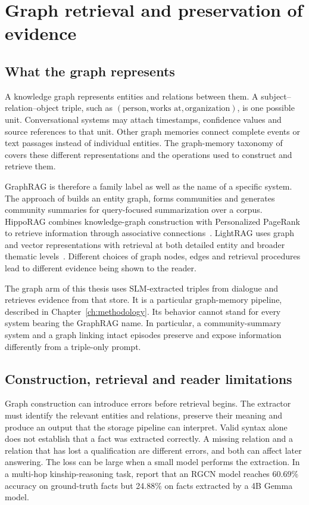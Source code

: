 \section{Graph retrieval and preservation of evidence}
\label{sec:ch2_graphs}

\subsection{What the graph represents}

A knowledge graph represents entities and relations between them. A subject--relation--object
triple, such as $(\text{person},\text{works at},\text{organization})$, is one possible unit.
Conversational systems may attach timestamps, confidence values and source references to
that unit. Other graph memories connect complete events or text passages instead of
individual entities. The graph-memory taxonomy of \citet{graph_memory_survey2026} covers
these different representations and the operations used to construct and retrieve them.

GraphRAG is therefore a family label as well as the name of a specific system. The
approach of \citet{graphrag_edge2024} builds an entity graph, forms communities and generates
community summaries for query-focused summarization over a corpus. HippoRAG combines
knowledge-graph construction with Personalized PageRank to retrieve information through
associative connections~\citep{hipporag2024}. LightRAG uses graph and vector representations
with retrieval at both detailed entity and broader thematic levels~\citep{light_rag}.
Different choices of graph nodes, edges and retrieval procedures lead to different
evidence being shown to the reader.

The graph arm of this thesis uses SLM-extracted triples from dialogue and retrieves
evidence from that store. It is a particular graph-memory pipeline, described in
Chapter~\ref{ch:methodology}. Its behavior cannot stand for every system bearing the
GraphRAG name. In particular, a community-summary system and a graph linking intact
episodes preserve and expose information differently from a triple-only prompt.

\subsection{Construction, retrieval and reader limitations}

Graph construction can introduce errors before retrieval begins. The extractor must
identify the relevant entities and relations, preserve their meaning and produce an
output that the storage pipeline can interpret. Valid syntax alone does not establish
that a fact was extracted correctly. A missing relation and a relation that has lost a
qualification are different errors, and both can affect later answering. The loss can be
large when a small model performs the extraction. In a multi-hop kinship-reasoning task,
\citet{kelesis2026} report that an RGCN model reaches 60.69\% accuracy on ground-truth
facts but 24.88\% on facts extracted by a 4B Gemma model.

